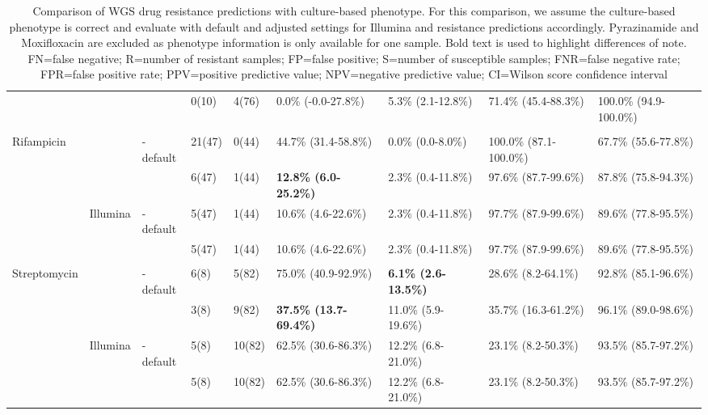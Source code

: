 \begin{table}
{\begin{tabular}{@{}lllllllll@{}}
 &
   &
  \mykrobe{} &
  0(10) &
  4(76) &
  0.0\% (-0.0-27.8\%) &
  5.3\% (2.1-12.8\%) &
  71.4\% (45.4-88.3\%) &
  100.0\% (94.9-100.0\%) \\ \\ \cmidrule(l){3-9} 
\multirow{4}{*}{Rifampicin} &
  \multirow{2}{*}{\ont{}} &
  \mykrobe{}-default &
  21(47) &
  0(44) &
  44.7\% (31.4-58.8\%) &
  0.0\% (0.0-8.0\%) &
  100.0\% (87.1-100.0\%) &
  67.7\% (55.6-77.8\%) \\
 &
   &
  \mykrobe{} &
  6(47) &
  1(44) &
  \textbf{12.8\% (6.0-25.2\%)} &
  2.3\% (0.4-11.8\%) &
  97.6\% (87.7-99.6\%) &
  87.8\% (75.8-94.3\%) \\
 &
  \multirow{2}{*}{Illumina} &
  \mykrobe{}-default &
  5(47) &
  1(44) &
  10.6\% (4.6-22.6\%) &
  2.3\% (0.4-11.8\%) &
  97.7\% (87.9-99.6\%) &
  89.6\% (77.8-95.5\%) \\
 &
   &
  \mykrobe{} &
  5(47) &
  1(44) &
  10.6\% (4.6-22.6\%) &
  2.3\% (0.4-11.8\%) &
  97.7\% (87.9-99.6\%) &
  89.6\% (77.8-95.5\%) \\ \\ \cmidrule(l){3-9} 
\multirow{4}{*}{Streptomycin} &
  \multirow{2}{*}{\ont{}} &
  \mykrobe{}-default &
  6(8) &
  5(82) &
  75.0\% (40.9-92.9\%) &
  \textbf{6.1\% (2.6-13.5\%)} &
  28.6\% (8.2-64.1\%) &
  92.8\% (85.1-96.6\%) \\
 &
   &
  \mykrobe{} &
  3(8) &
  9(82) &
  \textbf{37.5\% (13.7-69.4\%)} &
  11.0\% (5.9-19.6\%) &
  35.7\% (16.3-61.2\%) &
  96.1\% (89.0-98.6\%) \\
 &
  \multirow{2}{*}{Illumina} &
  \mykrobe{}-default &
  5(8) &
  10(82) &
  62.5\% (30.6-86.3\%) &
  12.2\% (6.8-21.0\%) &
  23.1\% (8.2-50.3\%) &
  93.5\% (85.7-97.2\%) \\
 &
   &
  \mykrobe{} &
  5(8) &
  10(82) &
  62.5\% (30.6-86.3\%) &
  12.2\% (6.8-21.0\%) &
  23.1\% (8.2-50.3\%) &
  93.5\% (85.7-97.2\%) \\ \cmidrule(l){3-9} 
\end{tabular}%
}
\caption{Comparison of WGS drug resistance predictions with culture-based phenotype. For this comparison, we assume the culture-based phenotype is correct and evaluate \mykrobe{} with default and adjusted settings for Illumina and \ont{} resistance predictions accordingly. Pyrazinamide and Moxifloxacin are excluded as phenotype information is only available for one sample. Bold text is used to highlight differences of note. FN=false negative; R=number of resistant samples; FP=false positive; S=number of susceptible samples; FNR=false negative rate; FPR=false positive rate; PPV=positive predictive value; NPV=negative predictive value; CI=Wilson score confidence interval}
\label{tab:mykrobe-settings-pheno}
\end{table}

